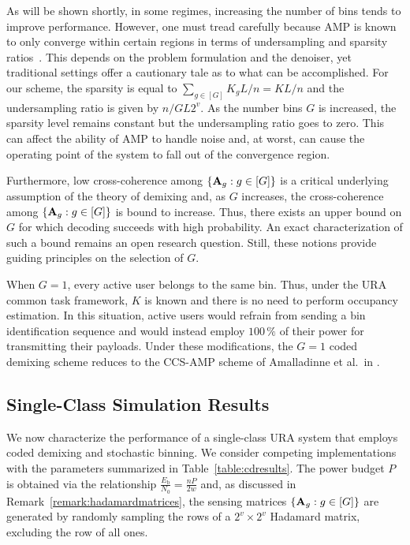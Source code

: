 \documentclass[journal]{IEEEtran}
\begin{document}
\begin{remark}
\label{remark:binlimits}
As will be shown shortly, in some regimes, increasing the number of bins tends to improve performance. 
However, one must tread carefully because AMP is known to only converge within certain regions in terms of undersampling and sparsity ratios~\cite{donoho2009message}.
This depends on the problem formulation and the denoiser, yet traditional settings offer a cautionary tale as to what can be accomplished.
For our scheme, the sparsity is equal to $\sum_{g \in [G]}K_gL/n = KL/n$ and the undersampling ratio is given by $n/GL2^v$.  
As the number bins $G$ is increased, the sparsity level remains constant but the undersampling ratio goes to zero.
This can affect the ability of AMP to handle noise and, at worst, can cause the operating point of the system to fall out of the convergence region.

Furthermore, low cross-coherence among $\{\mathbf{A}_g : g \in [G]\}$ is a critical underlying assumption of the theory of demixing and, as $G$ increases, the cross-coherence among $\{\mathbf{A}_g : g \in [G]\}$ is bound to increase.
Thus, there exists an upper bound on $G$ for which decoding succeeds with high probability. 
An exact characterization of such a bound remains an open research question.
Still, these notions provide guiding principles on the selection of $G$.
\end{remark}
\begin{remark}
When $G = 1$, every active user belongs to the same bin.
Thus, under the URA common task framework, $K$ is known and there is no need to perform occupancy estimation. 
In this situation, active users would refrain from sending a bin identification sequence and would instead employ $100\,\%$ of their power for transmitting their payloads. 
Under these modifications, the $G=1$ coded demixing scheme reduces to the CCS-AMP scheme of Amalladinne et al.\ in \cite{amalladinne2020unsourced}.
\end{remark}

\subsection{Single-Class Simulation Results}

We now characterize the performance of a single-class URA system that employs coded demixing and stochastic binning.
We consider competing implementations with the parameters summarized in Table~\ref{table:cdresults}.
The power budget $P$ is obtained via the relationship $\frac{E_{\mathrm{b}}}{N_0} = \frac{nP}{2w}$ and, as discussed in Remark~\ref{remark:hadamardmatrices}, the sensing matrices $\{\mathbf{A}_g : g \in [G]\}$ are generated by randomly sampling the rows of a $2^v \times 2^v$ Hadamard matrix, excluding the row of all ones. 
\end{document}
